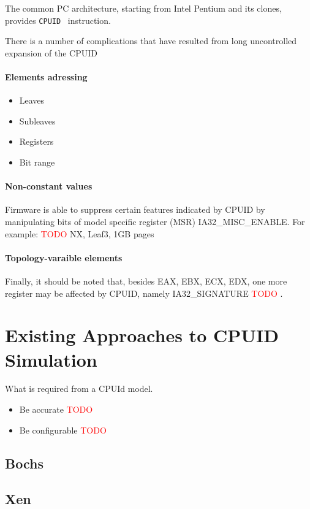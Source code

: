 \documentclass[a4paper,10pt,oneside,unicode]{article}
\newcommand{\todo}[1][]{\textcolor{red}{TODO #1}}
\begin{document}
The common PC architecture, starting from Intel Pentium and its clones, provides \texttt{CPUID}~\cite{intelmanual-7vols} instruction. 

There is a number of complications that have resulted from long uncontrolled expansion of the CPUID

\paragraph{Elements adressing}

\begin{itemize}
\item Leaves
\item Subleaves
\item Registers
\item Bit range
\end{itemize}


\paragraph{Non-constant values} Firmware is able to suppress certain features indicated by CPUID by manipulating bits of model specific register (MSR) IA32\_MISC\_ENABLE. For example: \todo{NX, Leaf3, 1GB pages}

\paragraph{Topology-varaible elements}

Finally, it should be noted that, besides EAX, EBX, ECX, EDX, one more register may be affected by CPUID, namely IA32\_SIGNATURE \todo.

\section{Existing Approaches to CPUID Simulation}

What is required from a CPUId model.
\begin{itemize}
\item Be accurate \todo
\item Be configurable \todo
\end{itemize}

\subsection{Bochs}

\subsection{Xen}
\end{document}
